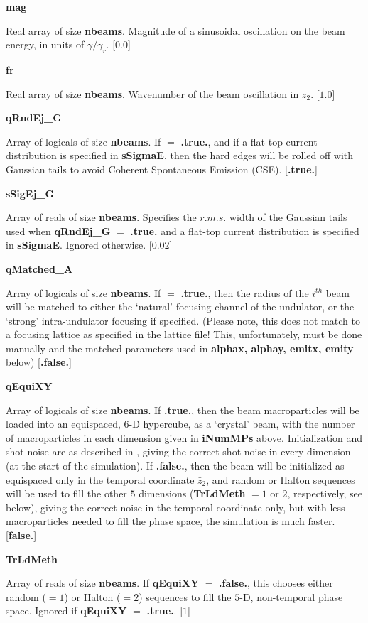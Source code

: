\documentclass[12pt]{article}%
\begin{document}
{\bf mag}

Real array of size {\bf nbeams}. Magnitude of a sinusoidal oscillation on the beam energy, in units of $\gamma / \gamma_r$. [$0.0$]

{\bf fr}

Real array of size {\bf nbeams}. Wavenumber of the beam oscillation in $\bar{z}_2$. [$1.0$]


{\bf qRndEj\_G}

Array of logicals of size {\bf nbeams}. If $=$ {\bf .true.}, and if a flat-top current distribution is specified in {\bf sSigmaE}, then the hard edges will be rolled off with Gaussian tails to avoid Coherent Spontaneous Emission (CSE). [{\bf .true.}]

{\bf sSigEj\_G}

Array of reals of size {\bf nbeams}. Specifies the $r.m.s.$ width of the Gaussian tails used when {\bf qRndEj\_G} $=$ {\bf .true.} and a flat-top current distribution is specified in {\bf sSigmaE}. Ignored otherwise. [$0.02$]


{\bf qMatched\_A}

Array of logicals of size {\bf nbeams}. If $=$ {\bf .true.}, then the radius of the $i^{th}$ beam will be matched to either the `natural' focusing channel of the undulator, or the `strong' intra-undulator focusing if specified. (Please note, this does not match to a focusing lattice as specified in the lattice file! This, unfortunately, must be done manually and the matched parameters used in {\bf alphax, alphay, emitx, emity} below) [{\bf .false.}]

{\bf qEquiXY}

Array of logicals of size {\bf nbeams}. If {\bf .true.}, then the beam macroparticles will be loaded into an equispaced, $6$-D hypercube, as a `crystal' beam, with the number of macroparticles in each dimension given in {\bf iNumMPs} above. Initialization and shot-noise are as described in \cite{noise1}, giving the correct shot-noise in every dimension (at the start of the simulation). If {\bf .false.}, then the beam will be initialized as equispaced only in the temporal coordinate $\bar{z}_2$, and random or Halton sequences will be used to fill the other $5$ dimensions ({\bf TrLdMeth} $= 1$ or $2$, respectively, see below), giving the correct noise in the temporal coordinate only, but with less macroparticles needed to fill the phase space, the simulation is much faster. [{\bf \.false.}]

{\bf TrLdMeth}

Array of reals of size {\bf nbeams}. If {\bf qEquiXY} $=$ {\bf .false.}, this chooses either random ($=1$) or Halton ($=2$) sequences to fill the $5$-D, non-temporal phase space. Ignored if {\bf qEquiXY} $=$ {\bf .true.}. [$1$]
\end{document}
